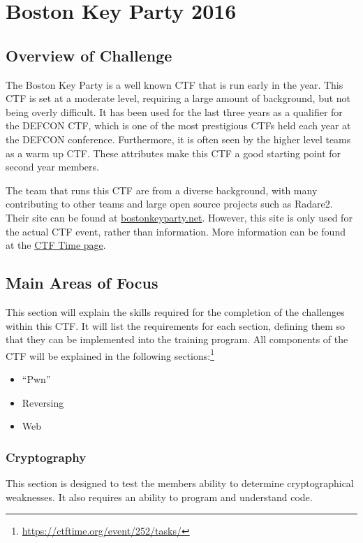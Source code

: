 \documentclass[twoside,a4paper,11pt]{report}
\begin{document}
\chapter{Boston Key Party 2016}
	\section{Overview of Challenge}
		The Boston Key Party is a well known CTF that is run early in the year. 
		This CTF is set at a moderate level, requiring a large amount of background, but not being overly difficult. 
		It has been used for the last three years as a qualifier for the DEFCON CTF, 
		which is one of the most prestigious CTFs held each year at the DEFCON conference. 
		Furthermore, it is often seen by the higher level teams as a warm up CTF. 
		These attributes make this CTF a good starting point for second year members. 

		The team that runs this CTF are from a diverse background, with many contributing to other teams and large open source projects such as Radare2.
		Their site can be found at \href{https://web.archive.org/web/20160131055956/http://bostonkeyparty.net/}{bostonkeyparty.net}. 
		However, this site is only used for the actual CTF event, rather than information. 
		More information can be found at the \href{https://ctftime.org/event/252}{CTF Time page}.
	\section{Main Areas of Focus}
		This section will explain the skills required for the completion of the challenges within this CTF. 
		It will list the requirements for each section, defining them so that they can be implemented into the training program. 
		All components of the CTF will be explained in the following sections:\footnote{\url{https://ctftime.org/event/252/tasks/}}
		\begin{itemize}
			\item ``Pwn''
			\item Reversing
			\item Web
		\end{itemize}
		\subsection{Cryptography}
			This section is designed to test the members ability to determine cryptographical weaknesses. 
			It also requires an ability to program and understand code. 
			
\end{document}
